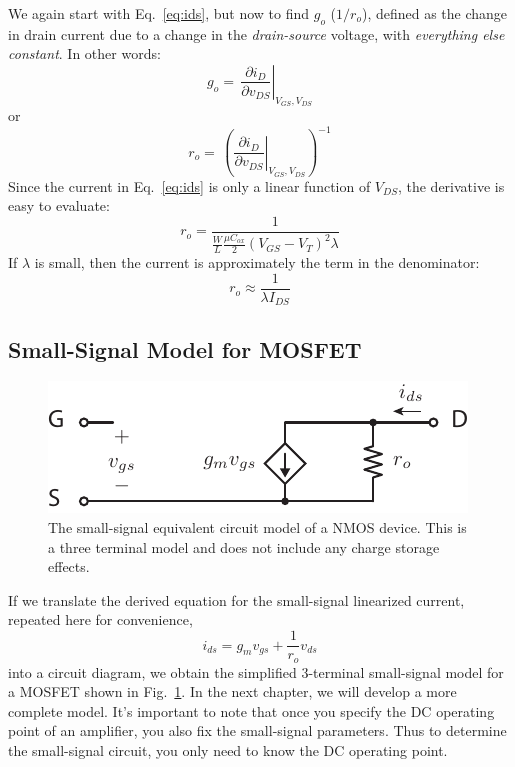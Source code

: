 We again start with Eq.~\ref{eq:ids}, but now to find $g_o$ ($1/r_o$), defined as the change in drain current due to a change in the \textit{drain-source} voltage, with \textit{everything else constant}.  In other words:
%
 \begin{equation}
	{g_o} = \,{ {{{\left. {\frac{{\partial {i_D}}}{{\partial {v_{DS}}}}} \right|}_{{V_{GS}},{V_{DS}}}}} }
\end{equation}
%
or
%
\begin{equation}
	{r_o} = \,{\left( {{{\left. {\frac{{\partial {i_D}}}{{\partial {v_{DS}}}}} \right|}_{{V_{GS}},{V_{DS}}}}} \right)^{ - 1}}
\end{equation}
%
Since the current in Eq.~\ref{eq:ids} is only a linear function of $V_{DS}$, the derivative is easy to evaluate:
%
\begin{equation}
	{r_o} = \frac{1}{{\frac{W}{L}\frac{{\mu {C_{ox}}}}{2}{{({V_{GS}} - {V_T})}^2}\lambda }}
\end{equation}
%
If $\lambda$ is small, then the current is approximately the term in the denominator:
%
\begin{equation}
	{r_o} \approx \frac{1}{{\lambda {I_{DS}}}}
\end{equation}
%



\subsection{Small-Signal Model for MOSFET}

\begin{figure}[tb]
\begin{center}
\includegraphics[scale=1]{mos3term_ac_nocap}
\end{center}
\caption{The small-signal equivalent circuit model of a NMOS device.  This is a three terminal model and does not include any charge storage effects.} \label{fig:mos3term_ac_nocap}
\end{figure}

If we translate the derived equation for the small-signal linearized current, repeated here for convenience,
\begin{equation}
	{i_{ds}} = {g_m}{v_{gs}} + \frac{1}{{{r_o}}}{v_{ds}}
\end{equation}
into a circuit diagram, we obtain the simplified  3-terminal small-signal model for a MOSFET shown in Fig.~\ref{fig:mos3term_ac_nocap}.   In the next chapter, we will develop a more complete model.  It's important to note that once you specify the DC operating point of an amplifier, you also fix the small-signal parameters.  Thus to determine the small-signal circuit, you only need to know the DC operating point.





